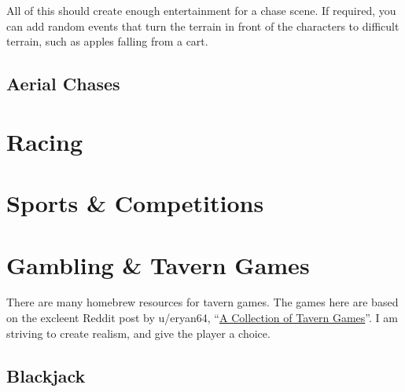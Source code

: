\documentclass[twocolumn]{dndbook}
\begin{document}
All of this should create enough entertainment for a chase scene.
If required, you can add random events that turn the terrain in front of the characters to difficult terrain, such as apples falling from a cart.\par




\subsection{Aerial Chases}
\section{Racing}
\section{Sports \& Competitions}



\section{Gambling \& Tavern Games}

There are many homebrew resources for tavern games.
The games here are based on the excleent Reddit post by u/eryan64, ``\href{https://www.reddit.com/r/DnDBehindTheScreen/comments/fn6tng/a_collection_of_tavern_games/}{A Collection of Tavern Games}''.
I am striving to create realism, and give the player a choice.

\subsection{Blackjack}
\end{document}
